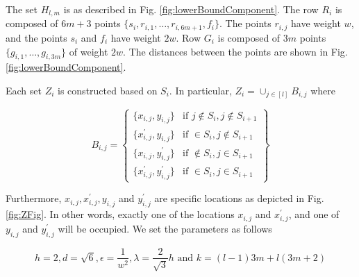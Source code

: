 \documentclass{article}
\begin{document}

The set $H_{l,m}$ is as described in Fig. \ref{fig:lowerBoundComponent}. The row $R_i$ is composed of $6m + 3$ points $\{s_i, r_{i, 1}, \ldots, r_{i, 6m+1}, f_i\}$. The points $r_{i, j}$ have weight $w$, and the points $s_i$ and $f_i$ have weight $2w$. Row $G_i$ is composed of $3m$ points $\{g_{i,1}, \ldots, g_{i, 3m}\}$ of weight $2w$. The distances between the points are shown in Fig. \ref{fig:lowerBoundComponent}.



Each set $Z_i$ is constructed based on $S_i$. In particular, $Z_i = \cup_{j\in [l]} B_{i,j}$ where 

$$ B_{i,j} = \left\{
	\begin{array}{ll}
		\{ x_{i, j}, y_{i,j} \}  &              \mbox{if } j\notin S_i,j\notin S_{i+1} \\
		\{ x_{i, j}^\prime, y_{i,j} \}  &       \mbox{if } \in S_i,j\notin S_{i+1} \\
		\{ x_{i, j}, y_{i,j}^\prime \}  &       \mbox{if } \notin S_i,j\in S_{i+1} \\
		\{ x_{i, j}^\prime, y_{i,j}^\prime \} & \mbox{if } \in S_i,j\in S_{i+1}	
        \end{array}
\right\}$$

Furthermore, $x_{i, j}, x_{i,j}^\prime, y_{i,j}$ and $y_{i, j}^\prime$ are specific locations as depicted in Fig. \ref{fig:ZFig}. In other words, exactly one of the locations $x_{i,j}$ and $x_{i,j}^\prime$, and one of $y_{i,j}$ and $y_{i,j}^\prime$ will be occupied. We set the parameters as follows

$$h = 2, d = \sqrt{6}, \epsilon = \frac{1}{w^2}, \lambda = \frac{2}{\sqrt{3}}h \text{ and }k = (l-1)3m + l(3m+2)$$

\end{document}
